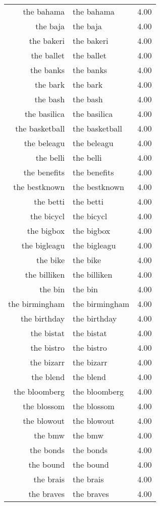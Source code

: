 \begin{table}[ht]
\begin{tabular}{rlr}
  the bahama & the bahama & 4.00 \\ 
  the baja & the baja & 4.00 \\ 
  the bakeri & the bakeri & 4.00 \\ 
  the ballet & the ballet & 4.00 \\ 
  the banks & the banks & 4.00 \\ 
  the bark & the bark & 4.00 \\ 
  the bash & the bash & 4.00 \\ 
  the basilica & the basilica & 4.00 \\ 
  the basketball & the basketball & 4.00 \\ 
  the beleagu & the beleagu & 4.00 \\ 
  the belli & the belli & 4.00 \\ 
  the benefits & the benefits & 4.00 \\ 
  the bestknown & the bestknown & 4.00 \\ 
  the betti & the betti & 4.00 \\ 
  the bicycl & the bicycl & 4.00 \\ 
  the bigbox & the bigbox & 4.00 \\ 
  the bigleagu & the bigleagu & 4.00 \\ 
  the bike & the bike & 4.00 \\ 
  the billiken & the billiken & 4.00 \\ 
  the bin & the bin & 4.00 \\ 
  the birmingham & the birmingham & 4.00 \\ 
  the birthday & the birthday & 4.00 \\ 
  the bistat & the bistat & 4.00 \\ 
  the bistro & the bistro & 4.00 \\ 
  the bizarr & the bizarr & 4.00 \\ 
  the blend & the blend & 4.00 \\ 
  the bloomberg & the bloomberg & 4.00 \\ 
  the blossom & the blossom & 4.00 \\ 
  the blowout & the blowout & 4.00 \\ 
  the bmw & the bmw & 4.00 \\ 
  the bonds & the bonds & 4.00 \\ 
  the bound & the bound & 4.00 \\ 
  the brais & the brais & 4.00 \\ 
  the braves & the braves & 4.00 \\ 

\end{tabular}
\end{table}
